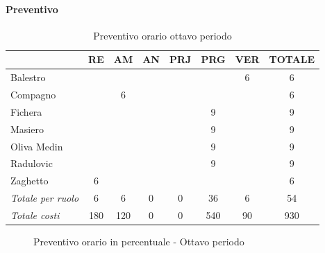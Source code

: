 \documentclass[a4paper,12pt]{article}
\begin{document}
            \paragraph{Preventivo}
                \begin{table}[H]
                \centering
                \caption{Preventivo orario ottavo periodo}
                \begin{tabular}{|l|c|c|c|c|c|c|c|}
                \hline
                    \rowcolor{lightgray}{\textbf{Membro}} & {\textbf{RE}} & {\textbf{AM}} & {\textbf{AN}} & {\textbf{PRJ}} & {\textbf{PRG}} & {\textbf{VER}} & {\textbf{TOTALE}}\\
                \hline
                    Balestro & & & & & & 6 & 6\\
                \hline
                    Compagno & & 6 & & & & & 6\\
                \hline
                    Fichera & & & & & 9 & & 9\\
                \hline
                    Masiero & & & & & 9 & & 9\\
                \hline
                    Oliva Medin & & & & & 9 & & 9\\
                \hline
                    Radulovic & & & & & 9 & & 9\\
                \hline
                    Zaghetto & 6 & & & & & & 6\\
                \hline
                    \rowcolor{lightgray}\textit{Totale per ruolo} & 6 & 6 & 0 & 0 & 36 & 6 & 54\\
                \hline
                    \rowcolor{lightgray}\textit{Totale costi} & 180 & 120 & 0 & 0 & 540 & 90 & 930\\
                \hline
                \end{tabular}
                \end{table}

                \begin{figure}[H]
                \centering
                \caption{Preventivo orario in percentuale - Ottavo periodo}
                \end{figure}
                
\end{document}

